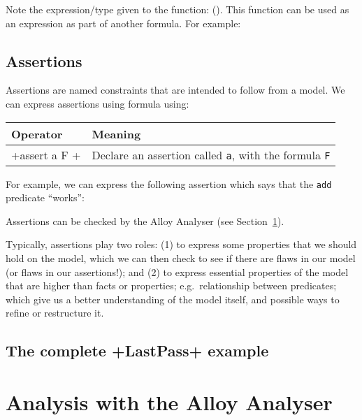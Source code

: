Note the expression/type given to the function: (). This function can be used as an expression as part of another formula. For example:


\subsection{Assertions}

Assertions are named constraints that are intended to follow from a model. We can express assertions using formula using:

\begin{center}
\begin{tabular}{ll}
\toprule
 Operator & Meaning\\
\midrule
 \A+assert a { F }+ & Declare an assertion called \texttt{a}, with the formula \texttt{F}\\
\bottomrule
\end{tabular}
\end{center}

For example, we can express the following assertion which says that the \texttt{add} predicate ``works'':

Assertions can be checked by the Alloy Analyser (see Section~\ref{sec:specification:alloy-analyser}).

Typically, assertions play two roles: (1) to express some properties that we should hold on the model, which we can then check to see if there are flaws in our model (or flaws in our assertions!); and (2) to express essential properties of the model that are higher than facts or properties; e.g.\ relationship between predicates; which give us a better understanding of the model itself, and possible ways to refine or restructure it.

\subsection{The complete \A+LastPass+ example}


\section{Analysis with the Alloy Analyser}
\label{sec:specification:alloy-analyser}

